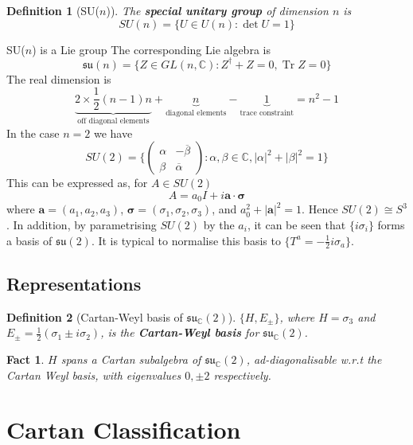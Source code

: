 \documentclass{article}
\newtheorem{definition}{Definition}[subsection]
\newtheorem{fact}{Fact}[subsection]
\DeclareMathOperator{\tr}{Tr}
\newcommand{\bam}[1]{\textbf{#1}}
\newcommand{\mf}[1]{\mathfrak{#1}}
\newcommand{\mbb}[1]{\mathbb{#1}}
\begin{document}
\begin{definition}[SU($n$)]
The \bam{special unitary group} of dimension $n$ is
\[
SU\left(n\right)=\lbrace U\in U(n) : \det{U}=1 \rbrace
\]
\end{definition}
\noindent SU($n$) is a Lie group The corresponding Lie algebra is 
\[
\mf{su}\left(n\right)=\lbrace Z\in GL\left(n,\mbb{C}\right) : Z^\dagger+Z=0, \tr{Z}=0 \rbrace
\]
The real dimension is
\[
\underbrace{2\times\frac{1}{2}(n-1)n}_{\text{off diagonal elements}}+\underbrace{n}_{\text{diagonal elements}}-\underbrace{1}_{\text{trace constraint}}=n^2-1
\]
In the case $n=2$ we have 
\[
SU(2)=\lbrace   \begin{pmatrix} \alpha & -\overline{\beta} \\ \beta & \overline{\alpha} \end{pmatrix}  : \alpha,\beta\in\mathbb{C} , |\alpha|^2+|\beta|^2=1  \rbrace
\]
This can be expressed as, for $A\in SU(2)$
\[
A=a_0 I +i\bm{a}\cdot\bm{\sigma}
\]
where $\bm{a}=(a_1, a_2, a_3)$, $\bm{\sigma}=(\sigma_1, \sigma_2, \sigma_3)$, and $a_0^2+|\bm{a}|^2=1$. Hence $SU(2)\cong S^3$. In addition, by parametrising $SU(2)$ by the $a_i$, it can be seen that $\lbrace i\sigma_i\rbrace$ forms a basis of $\mf{su}(2)$. It is typical to normalise this basis to $\lbrace T^a=-\frac{1}{2} i\sigma_a \rbrace$. 

\subsection{Representations}

\begin{definition}[Cartan-Weyl basis of $\mf{su}_\mbb{C}(2)$]
$\lbrace H, E_\pm \rbrace$, where $H=\sigma_3$ and $E_\pm=\frac{1}{2}(\sigma_1\pm i\sigma_2 )$, is the \bam{Cartan-Weyl basis} for $\mf{su}_\mbb{C}(2)$. 
\end{definition} 

\begin{fact}
$H$ spans a Cartan subalgebra of $\mf{su}_\mbb{C}(2)$, ad-diagonalisable w.r.t the Cartan Weyl basis, with eigenvalues $0, \pm 2$ respectively. 
\end{fact}


\section{Cartan Classification}
\end{document}
